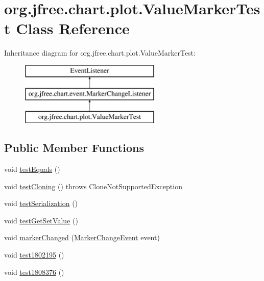\hypertarget{classorg_1_1jfree_1_1chart_1_1plot_1_1_value_marker_test}{}\section{org.\+jfree.\+chart.\+plot.\+Value\+Marker\+Test Class Reference}
\label{classorg_1_1jfree_1_1chart_1_1plot_1_1_value_marker_test}
Inheritance diagram for org.\+jfree.\+chart.\+plot.\+Value\+Marker\+Test\+:\begin{figure}[H]
\begin{center}
\leavevmode
\includegraphics[height=3.000000cm]{classorg_1_1jfree_1_1chart_1_1plot_1_1_value_marker_test}
\end{center}
\end{figure}
\subsection*{Public Member Functions}
\begin{DoxyCompactItemize}
\item 
void \mbox{\hyperlink{classorg_1_1jfree_1_1chart_1_1plot_1_1_value_marker_test_a4cd612de9a6b637417d467a2d5cfeb04}{test\+Equals}} ()
\item 
void \mbox{\hyperlink{classorg_1_1jfree_1_1chart_1_1plot_1_1_value_marker_test_a25d7959c4cde3a472063d3fe265041b5}{test\+Cloning}} ()  throws Clone\+Not\+Supported\+Exception 
\item 
void \mbox{\hyperlink{classorg_1_1jfree_1_1chart_1_1plot_1_1_value_marker_test_a81dd054c6a69d896c32540425e3f8136}{test\+Serialization}} ()
\item 
void \mbox{\hyperlink{classorg_1_1jfree_1_1chart_1_1plot_1_1_value_marker_test_a94266b341cfcf362cfc602fcfb40f7c3}{test\+Get\+Set\+Value}} ()
\item 
void \mbox{\hyperlink{classorg_1_1jfree_1_1chart_1_1plot_1_1_value_marker_test_a3fa1fe77ea5a55945955a0bb31672627}{marker\+Changed}} (\mbox{\hyperlink{classorg_1_1jfree_1_1chart_1_1event_1_1_marker_change_event}{Marker\+Change\+Event}} event)
\item 
void \mbox{\hyperlink{classorg_1_1jfree_1_1chart_1_1plot_1_1_value_marker_test_a1e5f675f58875ff9f0325a81f126e447}{test1802195}} ()
\item 
void \mbox{\hyperlink{classorg_1_1jfree_1_1chart_1_1plot_1_1_value_marker_test_ad77b9b30db34508c637673e8dcbf4402}{test1808376}} ()
\end{DoxyCompactItemize}


